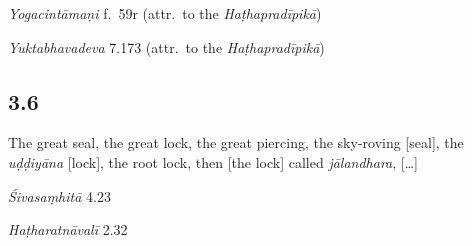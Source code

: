 \begin{ekdosis}
\begin{testimonia}[hp03_005]
\emph{Yogacintāmaṇi} f.~59r (attr.~to the \emph{Haṭhapradīpikā})
\begin{versinnote}
\end{versinnote}

\emph{Yuktabhavadeva} 7.173 (attr.~to the \emph{Haṭhapradīpikā})
\begin{versinnote}
\end{versinnote}
\end{testimonia}


\subsection*{3.6}
\begin{translation}[hp03_006]
The great seal, the great lock, the great piercing, the sky-roving [seal], the \emph{uḍḍiyāna} [lock], the root lock, then [the lock] called \emph{jālandhara}, [\dots] 
\end{translation}

\begin{sources}[hp03_006]

\emph{Śivasaṃhitā} 4.23
\begin{versinnote}
\end{versinnote}
\end{sources}

\begin{testimonia}[hp03_006]
\emph{Haṭharatnāvalī} 2.32


\end{testimonia}
\end{ekdosis}
